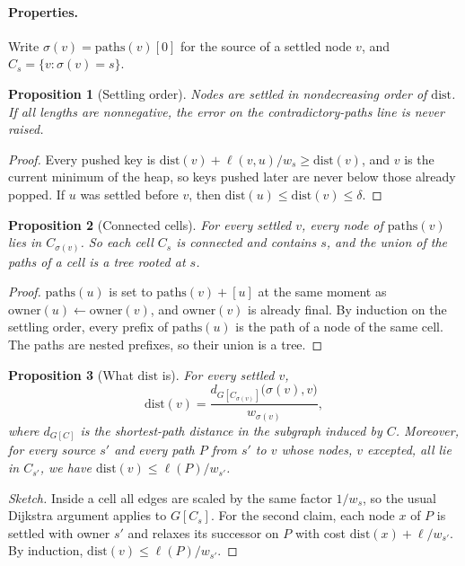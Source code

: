 \documentclass[11pt,a4paper]{article}
\newtheorem{proposition}{Proposition}
\theoremstyle{remark}
\newcommand{\dist}{\mathrm{dist}}
\newcommand{\owner}{\mathrm{owner}}
\newcommand{\paths}{\mathrm{paths}}
\begin{document}
\paragraph{Properties.} Write $\sigma(v)=\paths(v)[0]$ for the source of a
settled node $v$, and $C_s=\{v:\sigma(v)=s\}$.

\begin{proposition}[Settling order]\label{prop:order}
Nodes are settled in nondecreasing order of $\dist$. If all lengths are
nonnegative, the error on the contradictory-paths line is never raised.
\end{proposition}
\begin{proof}
Every pushed key is $\dist(v)+\ell(v,u)/w_s\ge\dist(v)$, and $v$ is the current
minimum of the heap, so keys pushed later are never below those already popped.
If $u$ was settled before $v$, then $\dist(u)\le\dist(v)\le\delta$.
\end{proof}

\begin{proposition}[Connected cells]\label{prop:connected}
For every settled $v$, every node of $\paths(v)$ lies in $C_{\sigma(v)}$. So
each cell $C_s$ is connected and contains $s$, and the union of the paths of a
cell is a tree rooted at $s$.
\end{proposition}
\begin{proof}
$\paths(u)$ is set to $\paths(v)+[u]$ at the same moment as $\owner(u)\gets\owner(v)$,
and $\owner(v)$ is already final. By induction on the settling order, every
prefix of $\paths(u)$ is the path of a node of the same cell. The paths are
nested prefixes, so their union is a tree.
\end{proof}

\begin{proposition}[What $\dist$ is]\label{prop:dist}
For every settled $v$,
\[
\dist(v)=\frac{d_{G[C_{\sigma(v)}]}\bigl(\sigma(v),v\bigr)}{w_{\sigma(v)}},
\]
where $d_{G[C]}$ is the shortest-path distance in the subgraph induced by $C$.
Moreover, for every source $s'$ and every path $P$ from $s'$ to $v$ whose
nodes, $v$ excepted, all lie in $C_{s'}$, we have $\dist(v)\le \ell(P)/w_{s'}$.
\end{proposition}
\begin{proof}[Sketch]
Inside a cell all edges are scaled by the same factor $1/w_s$, so the usual
Dijkstra argument applies to $G[C_s]$. For the second claim, each node $x$ of
$P$ is settled with owner $s'$ and relaxes its successor on $P$ with cost
$\dist(x)+\ell/w_{s'}$. By induction, $\dist(v)\le\ell(P)/w_{s'}$.
\end{proof}
\end{document}
